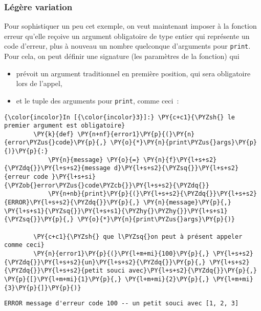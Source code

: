     \hypertarget{luxe9guxe8re-variation}{%
\subsubsection{Légère variation}\label{luxe9guxe8re-variation}}

    Pour sophistiquer un peu cet exemple, on veut maintenant imposer à la
fonction erreur qu'elle reçoive un argument obligatoire de type entier
qui représente un code d'erreur, plus à nouveau un nombre quelconque
d'arguments pour \texttt{print}.\\

Pour cela, on peut définir une signature (les paramètres de la fonction)
qui

\begin{itemize}
	\item 
	prévoit un argument traditionnel en première position, qui sera
	obligatoire lors de l'appel,
	\item
	et le tuple des arguments pour \texttt{print}, comme ceci~:
\end{itemize}

    \begin{Verbatim}[commandchars=\\\{\}]
{\color{incolor}In [{\color{incolor}3}]:} \PY{c+c1}{\PYZsh{} le premier argument est obligatoire}
        \PY{k}{def} \PY{n+nf}{error1}\PY{p}{(}\PY{n}{error\PYZus{}code}\PY{p}{,} \PY{o}{*}\PY{n}{print\PYZus{}args}\PY{p}{)}\PY{p}{:}
            \PY{n}{message} \PY{o}{=} \PY{n}{f}\PY{l+s+s2}{\PYZdq{}}\PY{l+s+s2}{message d}\PY{l+s+s2}{\PYZsq{}}\PY{l+s+s2}{erreur code }\PY{l+s+si}{\PYZob{}error\PYZus{}code\PYZcb{}}\PY{l+s+s2}{\PYZdq{}}
            \PY{n+nb}{print}\PY{p}{(}\PY{l+s+s2}{\PYZdq{}}\PY{l+s+s2}{ERROR}\PY{l+s+s2}{\PYZdq{}}\PY{p}{,} \PY{n}{message}\PY{p}{,} \PY{l+s+s1}{\PYZsq{}}\PY{l+s+s1}{\PYZhy{}\PYZhy{}}\PY{l+s+s1}{\PYZsq{}}\PY{p}{,} \PY{o}{*}\PY{n}{print\PYZus{}args}\PY{p}{)}
            
        \PY{c+c1}{\PYZsh{} que l\PYZsq{}on peut à présent appeler comme ceci}
        \PY{n}{error1}\PY{p}{(}\PY{l+m+mi}{100}\PY{p}{,} \PY{l+s+s2}{\PYZdq{}}\PY{l+s+s2}{un}\PY{l+s+s2}{\PYZdq{}}\PY{p}{,} \PY{l+s+s2}{\PYZdq{}}\PY{l+s+s2}{petit souci avec}\PY{l+s+s2}{\PYZdq{}}\PY{p}{,} \PY{p}{[}\PY{l+m+mi}{1}\PY{p}{,} \PY{l+m+mi}{2}\PY{p}{,} \PY{l+m+mi}{3}\PY{p}{]}\PY{p}{)}
\end{Verbatim}


    \begin{Verbatim}[commandchars=\\\{\}]
ERROR message d'erreur code 100 -- un petit souci avec [1, 2, 3]

    \end{Verbatim}

